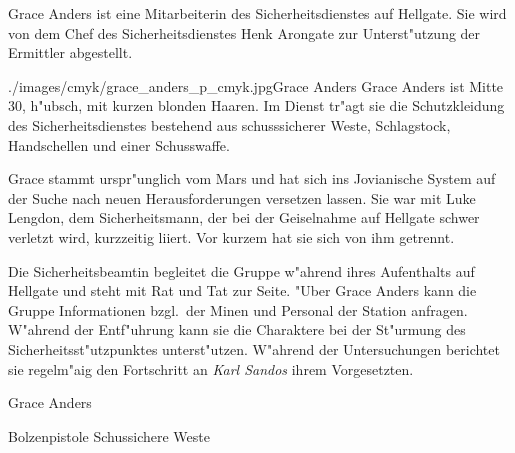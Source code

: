 
Grace Anders ist eine Mitarbeiterin des Sicherheitsdienstes auf Hellgate. Sie wird von dem Chef des Sicherheitsdienstes 
Henk Arongate zur Unterst"utzung der Ermittler abgestellt. 

\begin{sideimagebox}[l]{0.5}{./images/cmyk/grace_anders_p_cmyk.jpg}{Grace Anders}
    Grace Anders ist Mitte 30, h"ubsch, mit kurzen blonden Haaren. Im Dienst tr"agt sie die Schutzkleidung des Sicherheitsdienstes bestehend aus schusssicherer Weste, Schlagstock, Handschellen und einer Schusswaffe. 

    Grace stammt urspr"unglich vom Mars und hat sich ins Jovianische System auf der Suche nach neuen Herausforderungen 
    versetzen lassen. Sie war mit Luke Lengdon, dem Sicherheitsmann, der bei der Geiselnahme auf Hellgate schwer verletzt wird,
    kurzzeitig liiert. Vor kurzem hat sie sich von ihm getrennt.

    Die Sicherheitsbeamtin begleitet die Gruppe w"ahrend ihres Aufenthalts auf Hellgate und steht mit Rat und Tat zur Seite.
    "Uber Grace Anders kann die Gruppe Informationen bzgl.~der Minen und Personal der Station anfragen. W"ahrend der Entf"uhrung 
    kann sie die Charaktere bei der St"urmung des Sicherheitsst"utzpunktes unterst"utzen. W"ahrend der Untersuchungen berichtet 
    sie regelm"a\3ig den Fortschritt an \emph{Karl Sandos} ihrem Vorgesetzten.
\end{sideimagebox}

\begin{nscsheet}{Grace Anders}
    \nscstats[ATT=2,AGG=2,COM=2]
    \nscruler
    \begin{nscinventory}
        \nscitem[Waffen] Bolzenpistole
        \nscitem[R"ustung] Schussichere Weste
    \end{nscinventory}
\end{nscsheet}

